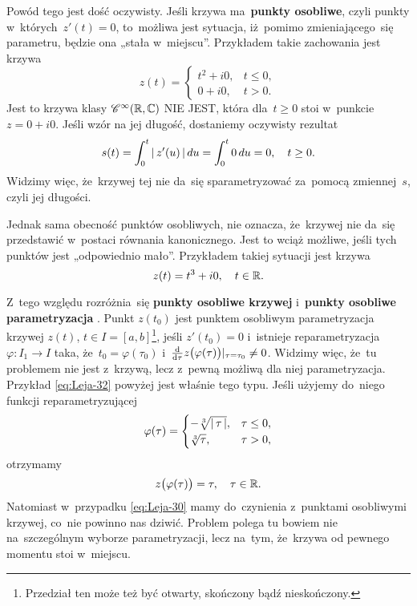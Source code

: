 \documentclass[a4paper,11pt]{article}
\begin{document}
Powód tego jest dość oczywisty. Jeśli krzywa ma~\textbf{punkty
  osobliwe}, czyli punkty w~których~$z'( t ) = 0$, to~możliwa jest
sytuacja, iż~pomimo zmieniającego~się parametru, będzie ona „stała
w~miejscu”. Przykładem takie zachowania jest krzywa
\begin{equation}
  \label{eq:Leja-30}
  z( t ) =
  \begin{cases}
    t^{ 2 } + i 0, & t \leq 0, \\
    0 + i 0, & t > 0.
  \end{cases}
\end{equation}
Jest to krzywa klasy $\mathcal{C}^{ \infty }( \mathbb{R}, \mathbb{C} )$ NIE JEST, która
dla~$t \geq 0$ stoi w~punkcie $z = 0 + i 0$. Jeśli wzór na jej
długość, dostaniemy oczywisty rezultat
\begin{equation}
  \label{eq:Leja-31}
  \begin{split}
    s( t ) = \int_{ 0 }^{ t } |\, {  z'( u )  } \,| \, du = \int_{ 0 }^{ t } 0 \,
    du = 0, \quad t \geq 0.
  \end{split}
\end{equation}
Widzimy więc, że~krzywej tej nie da~się sparametryzować za~pomocą
zmiennej~$s$, czyli jej długości.

Jednak sama obecność punktów osobliwych, nie oznacza, że~krzywej nie
da~się przedstawić w~postaci równania kanonicznego. Jest to wciąż
możliwe, jeśli tych punktów jest „odpowiednio mało”. Przykładem
takiej sytuacji jest krzywa
\begin{equation}
  \label{eq:Leja-32}
  z( t ) = t^{ 3 } + i 0, \quad t \in \mathbb{R}.
\end{equation}

Z~tego względu rozróżnia~się \textbf{punkty osobliwe krzywej}
i~\textbf{punkty osobliwe parametryzacja}
\cite{GdowskiElementGeometriiRozniczkowejZZadaniami1999}. Punkt
$z( t_{ 0 } )$ jest punktem osobliwym parametryzacja krzywej $z( t )$,
$t \in I = [ a, b ]$\footnote{Przedział ten może też być otwarty,
  skończony bądź nieskończony.}, jeśli $z'( t_{ 0 } ) = 0$ i~istnieje
reparametryzacja $\varphi: I_{ 1 } \to I$ taka,
że~$t_{ 0 } = \varphi( \tau_{ 0 } )$
i~$\tfrac{ \mathrm{d} }{ \mathrm{d} \tau } z\big( \varphi( \tau ) \big)|_{ \tau = \tau_{
    0 } } \neq 0$. Widzimy więc, że~tu problemem nie jest z~krzywą,
lecz z~pewną możliwą dla niej parametryzacja. Przykład
\eqref{eq:Leja-32} powyżej jest właśnie tego typu. Jeśli użyjemy
do~niego funkcji reparametryzującej
\begin{equation}
  \label{eq:Leja-33}
  \varphi( \tau ) =
  \begin{cases}
    -\sqrt[3]{ |\, {  \tau  } \,| }, & \tau \leq 0, \\
    \sqrt[3]{ \tau }, & \tau > 0,
  \end{cases}
\end{equation}
otrzymamy
\begin{equation}
  \label{eq:Leja-34}
  z\big( \varphi( \tau ) \big) = \tau, \quad \tau \in \mathbb{R}.
\end{equation}
Natomiast w~przypadku \eqref{eq:Leja-30} mamy do~czynienia z~punktami
osobliwymi krzywej, co~nie powinno nas dziwić. Problem polega tu
bowiem nie na~szczególnym wyborze parametryzacji, lecz na~tym,
że~krzywa od pewnego momentu stoi w~miejscu.
\end{document}
